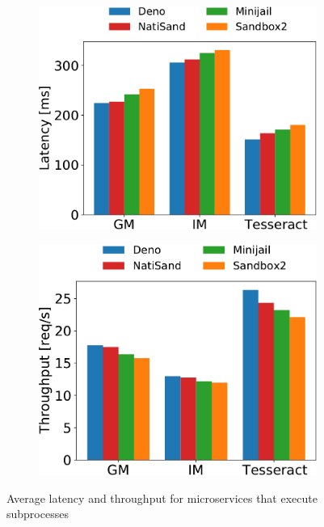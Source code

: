 \begin{figure}[!t]
	\begin{subfigure}{0.48\columnwidth}
		\includegraphics[width=\columnwidth]{chapters/natisand/fig/cropped-summary-subprocess-latency}
	\end{subfigure}%
	\hspace{0.5em}
	\begin{subfigure}{0.48\columnwidth}
		\includegraphics[width=\columnwidth]{chapters/natisand/fig/cropped-summary-subprocess-throughput}
	\end{subfigure}
	\caption[{Average latency and throughput of subprocess-based
	  microservices}]{
	  Average latency and throughput for microservices that execute
	  subprocesses
	}
	\label{fig:subprocess-lat-through}

\end{figure}

